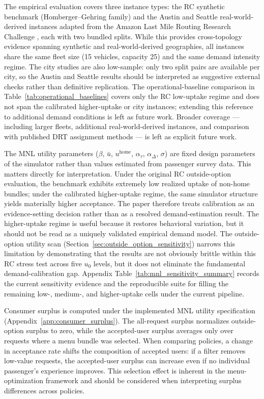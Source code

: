 The empirical evaluation covers three instance types: the RC synthetic benchmark (Homberger--Gehring family) and the Austin and Seattle real-world-derived instances adapted from the Amazon Last Mile Routing Research Challenge \citep{merchan2024amazon}, each with two bundled splits. While this provides cross-topology evidence spanning synthetic and real-world-derived geographies, all instances share the same fleet size (15 vehicles, capacity 25) and the same demand intensity regime. The city studies are also low-sample: only two split pairs are available per city, so the Austin and Seattle results should be interpreted as suggestive external checks rather than definitive replication. The operational-baseline comparison in Table~\ref{tab:operational_baselines} covers only the RC low-uptake regime and does not span the calibrated higher-uptake or city instances; extending this reference to additional demand conditions is left as future work. Broader coverage --- including larger fleets, additional real-world-derived instances, and comparison with published DRT assignment methods --- is left as explicit future work.

The MNL utility parameters ($\beta$, $\bar{u}$, $u^{\text{home}}$, $\alpha_\tau$, $\alpha_\Delta$, $\sigma$) are fixed design parameters of the simulator rather than values estimated from passenger survey data. This matters directly for interpretation. Under the original RC outside-option evaluation, the benchmark exhibits extremely low realized uptake of non-home bundles; under the calibrated higher-uptake regime, the same simulator structure yields materially higher acceptance. The paper therefore treats calibration as an evidence-setting decision rather than as a resolved demand-estimation result. The higher-uptake regime is useful because it restores behavioral variation, but it should not be read as a uniquely validated empirical demand model. The outside-option utility scan (Section~\ref{sec:outside_option_sensitivity}) narrows this limitation by demonstrating that the results are not obviously brittle within this RC stress test across five $u_0$ levels, but it does not eliminate the fundamental demand-calibration gap. Appendix Table~\ref{tab:mnl_sensitivity_summary} records the current sensitivity evidence and the reproducible suite for filling the remaining low-, medium-, and higher-uptake cells under the current pipeline.

Consumer surplus is computed under the implemented MNL utility specification (Appendix~\ref{app:consumer_surplus}). The all-request surplus normalizes outside-option surplus to zero, while the accepted-user surplus averages only over requests where a menu bundle was selected. When comparing policies, a change in acceptance rate shifts the composition of accepted users: if a filter removes low-value requests, the accepted-user surplus can increase even if no individual passenger's experience improves. This selection effect is inherent in the menu-optimization framework and should be considered when interpreting surplus differences across policies.

